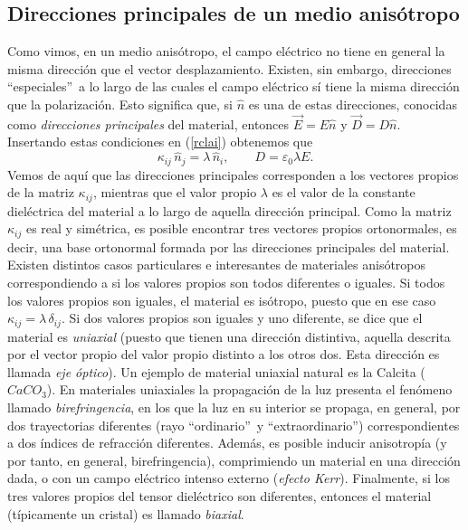 \subsection{Direcciones principales de un medio anisótropo}\label{secDP}

Como vimos, en un medio anisótropo, el campo eléctrico no tiene en general
la misma dirección que el vector desplazamiento.
Existen, sin embargo, direcciones ``especiales''\, a lo largo de las cuales el
campo eléctrico sí tiene la misma dirección que la polarización. Esto significa
que, si $\hat{n}$ es una de estas direcciones, conocidas como \textit{direcciones
principales} del material, entonces $\vec{E}=E\hat{n}$ y $\vec{D}=D\hat{n}$.
Insertando estas condiciones en (\ref{rclai}) obtenemos que
\begin{equation}
\kappa_{ij}\,\hat{n}_j= \lambda\,\hat{n}_i, \qquad D=\varepsilon_0\lambda E.
\end{equation}
Vemos de aquí que las direcciones principales corresponden a los vectores
propios de la matriz  $\kappa_{ij}$, mientras que el valor propio $\lambda$ es
el valor de la constante dieléctrica del material a lo largo de aquella
dirección principal. Como la matriz $\kappa_{ij}$ es real y simétrica, es
posible encontrar tres vectores propios ortonormales, es decir, una base
ortonormal formada por las direcciones principales del material. Existen
distintos casos particulares e interesantes de materiales anisótropos
correspondiendo a si los valores propios son todos diferentes o iguales. Si
todos los valores propios son iguales, el material es isótropo, puesto que en
ese caso $\kappa_{ij}=\lambda\,\delta_{ij}$. Si dos valores propios son iguales
y uno diferente, se dice que el material es \textit{uniaxial} (puesto que
tienen una dirección distintiva, aquella descrita por el vector propio del
valor propio distinto a los otros dos. Esta dirección es llamada \textit{eje
óptico}). Un ejemplo de material uniaxial natural es la Calcita ($CaCO_3$). En
materiales uniaxiales la propagación de la luz presenta el fenómeno llamado
\textit{birefringencia}, en los que la luz en su interior se propaga, en
general, por dos trayectorias diferentes (rayo ``ordinario''\, y
``extraordinario'') correspondientes a dos índices de refracción diferentes.
Además, es posible inducir anisotropía (y por tanto, en general,
birefringencia), comprimiendo un material en una dirección dada, o
con un campo eléctrico intenso externo (\textit{efecto Kerr}). Finalmente, si
los tres valores propios del tensor dieléctrico son diferentes, entonces el
material (típicamente un cristal) es llamado \textit{biaxial}.

